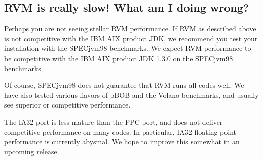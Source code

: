 \subsection{RVM is really slow! What am I doing wrong?}


Perhaps you are not seeing stellar RVM performance.  If RVM as described
above is not competitive with the IBM AIX product JDK, we recommend
you test your installation with the SPECjvm98 benchmarks.
We expect RVM performance to be competitive with the 
IBM AIX product JDK 1.3.0 on the SPECjvm98 benchmarks. 

Of course, SPECjvm98 does not guarantee that RVM runs all codes
well.  We have also tested various flavors of pBOB and the Volano
benchmarks, and usually see superior or competitive performance.

The IA32 port is less mature than the PPC port, and does not deliver
competitive performance on many codes.  In particular, IA32 floating-point
performance is currently abysmal.  We hope to improve this somewhat in an
upcoming release.

